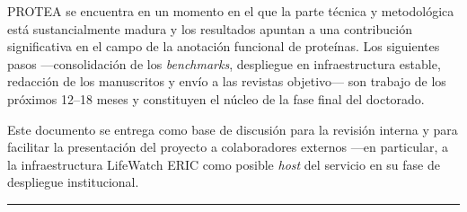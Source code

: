 \documentclass[11pt,a4paper]{article}
\begin{document}
PROTEA se encuentra en un momento en el que la parte técnica y metodológica
está sustancialmente madura y los resultados apuntan a una contribución
significativa en el campo de la anotación funcional de proteínas. Los
siguientes pasos —consolidación de los \emph{benchmarks}, despliegue en
infraestructura estable, redacción de los manuscritos y envío a las revistas
objetivo— son trabajo de los próximos 12–18 meses y constituyen el núcleo de
la fase final del doctorado.

Este documento se entrega como base de discusión para la revisión interna y
para facilitar la presentación del proyecto a colaboradores externos —en
particular, a la infraestructura LifeWatch ERIC como posible \emph{host} del
servicio en su fase de despliegue institucional.

\bigskip

\hrule

\vspace{1em}
\end{document}
